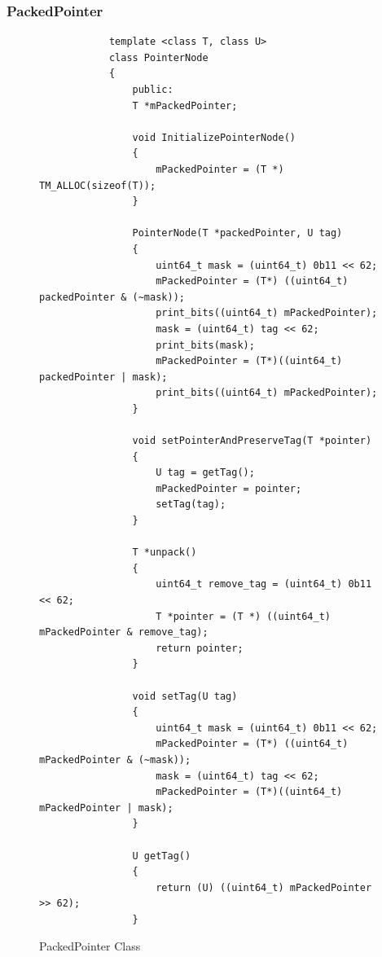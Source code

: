 \documentclass[letterpaper, 10 pt, conference]{ieeeconf}
\begin{document}
	\subsubsection{PackedPointer}
	\begin{figure}
		\begin{lstlisting}
			template <class T, class U>
			class PointerNode
			{
				public: 
				T *mPackedPointer;
				
				void InitializePointerNode()
				{
					mPackedPointer = (T *) TM_ALLOC(sizeof(T));
				}
				
				PointerNode(T *packedPointer, U tag)
				{
					uint64_t mask = (uint64_t) 0b11 << 62;
					mPackedPointer = (T*) ((uint64_t) packedPointer & (~mask));
					print_bits((uint64_t) mPackedPointer);
					mask = (uint64_t) tag << 62;
					print_bits(mask);
					mPackedPointer = (T*)((uint64_t) packedPointer | mask);
					print_bits((uint64_t) mPackedPointer);
				}
				
				void setPointerAndPreserveTag(T *pointer)
				{
					U tag = getTag();
					mPackedPointer = pointer;
					setTag(tag);
				}
				
				T *unpack()
				{
					uint64_t remove_tag = (uint64_t) 0b11 << 62;
					T *pointer = (T *) ((uint64_t) mPackedPointer & remove_tag);
					return pointer;
				}
				
				void setTag(U tag)
				{
					uint64_t mask = (uint64_t) 0b11 << 62;
					mPackedPointer = (T*) ((uint64_t) mPackedPointer & (~mask));
					mask = (uint64_t) tag << 62;
					mPackedPointer = (T*)((uint64_t) mPackedPointer | mask);
				}
				
				U getTag()
				{
					return (U) ((uint64_t) mPackedPointer >> 62);
				}
		\end{lstlisting}
		\caption{PackedPointer Class}
		\label{packedpointer}
	\end{figure}
	
\end{document}
